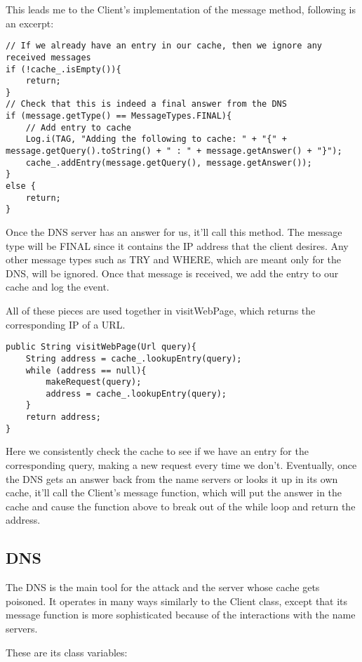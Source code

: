 \documentclass[a4paper, 12pt]{article} %
\begin{document}
This leads me to the Client's implementation of the message method, following is an excerpt:

\begin{lstlisting}
// If we already have an entry in our cache, then we ignore any received messages
if (!cache_.isEmpty()){
    return; 
}
// Check that this is indeed a final answer from the DNS
if (message.getType() == MessageTypes.FINAL){
	// Add entry to cache
    Log.i(TAG, "Adding the following to cache: " + "{" + message.getQuery().toString() + " : " + message.getAnswer() + "}");
    cache_.addEntry(message.getQuery(), message.getAnswer());
}
else {
    return;
}
\end{lstlisting}

Once the DNS server has an answer for us, it’ll call this method. The message type will be FINAL since it contains the IP address that the client desires. Any other message types such as TRY and WHERE, which are meant only for the DNS, will be ignored. Once that message is received, we add the entry to our cache and log the event. 

All of these pieces are used together in visitWebPage, which returns the corresponding IP of a URL.

\begin{lstlisting}
public String visitWebPage(Url query){
    String address = cache_.lookupEntry(query);
    while (address == null){
    	makeRequest(query);
    	address = cache_.lookupEntry(query);
    }
    return address;
}	
\end{lstlisting}

Here we consistently check the cache to see if we have an entry for the corresponding query, making a new request every time we don’t. Eventually, once the DNS gets an answer back from the name servers or looks it up in its own cache, it’ll call the Client’s message function, which will put the answer in the cache and cause the function above to break out of the while loop and return the address. 

\subsection*{DNS}

The DNS is the main tool for the attack and the server whose cache gets poisoned. It operates in many ways similarly to the Client class, except that its message function is more sophisticated because of the interactions with the name servers.

These are its class variables:
\end{document}
